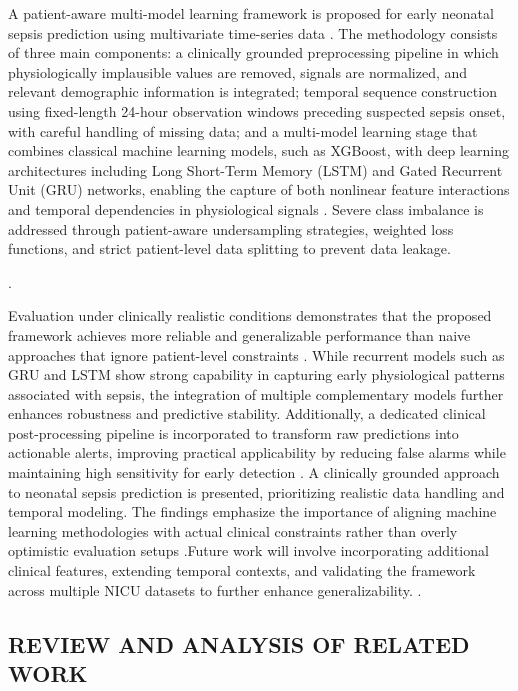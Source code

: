 \documentclass[conference]{IEEEtran}
\begin{document}
A patient-aware multi-model learning framework is proposed for early neonatal sepsis prediction using multivariate time-series data \cite{ehr_rnn_sepsis}. The methodology consists of three main components: a clinically grounded preprocessing pipeline in which physiologically implausible values are removed, signals are normalized, and relevant demographic information is integrated; temporal sequence construction using fixed-length 24-hour observation windows preceding suspected sepsis onset, with careful handling of missing data; and a multi-model learning stage that combines classical machine learning models, such as XGBoost, with deep learning architectures including Long Short-Term Memory (LSTM) and Gated Recurrent Unit (GRU) networks, enabling the capture of both nonlinear feature interactions and temporal dependencies in physiological signals \cite{ehr_rnn_sepsis}. Severe class imbalance is addressed through patient-aware undersampling strategies, weighted loss functions, and strict patient-level data splitting to prevent data leakage.

\cite{los_ml_mdpi}.

Evaluation under clinically realistic conditions demonstrates that the proposed framework achieves more reliable and generalizable performance than naive approaches that ignore patient-level constraints \cite{plos_ehr_sepsis}. While recurrent models such as GRU and LSTM show strong capability in capturing early physiological patterns associated with sepsis, the integration of multiple complementary models further enhances robustness and predictive stability. Additionally, a dedicated clinical post-processing pipeline is incorporated to transform raw predictions into actionable alerts, improving practical applicability by reducing false alarms while maintaining high sensitivity for early detection \cite{los_ml_mdpi}.
A clinically grounded approach to neonatal sepsis prediction is presented, prioritizing realistic data handling and temporal modeling. The findings emphasize the importance of aligning machine learning methodologies with actual clinical constraints rather than overly optimistic evaluation setups \cite{plos_ehr_sepsis}.Future work will involve incorporating additional clinical features, extending temporal contexts, and validating the framework across multiple NICU datasets to further enhance generalizability.
\cite{cnn_psd_sepsis}.\\


\subsection{REVIEW AND ANALYSIS OF RELATED WORK}
\end{document}
